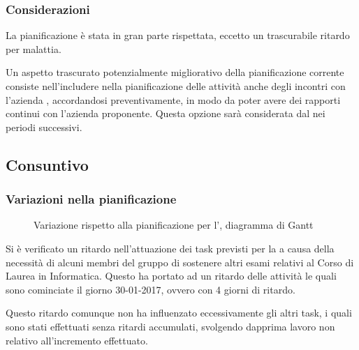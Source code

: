 \subsubsection{Considerazioni}
La pianificazione è stata in gran parte rispettata, eccetto un trascurabile ritardo per malattia. 

Un aspetto trascurato potenzialmente migliorativo della pianificazione corrente consiste nell'includere nella pianificazione delle attività anche degli incontri con l'azienda \ZU, accordandosi preventivamente, in modo da poter avere dei rapporti continui con l'azienda proponente. Questa opzione sarà considerata dal \Rx{} nei periodi successivi.



\pagebreak
\subsection{Consuntivo \ARI}
\introconsuntivo{\ARI}

\subsubsection{Variazioni nella pianificazione}

\begin{figure}[H]
\label{tab:cgen1}

  \caption{Variazione rispetto alla pianificazione per l'\ARI, diagramma di Gantt}
\end{figure}

Si è verificato un ritardo nell'attuazione dei task previsti per la \ARI{} a causa della necessità di alcuni membri del gruppo di sostenere altri esami relativi al Corso di Laurea in Informatica. Questo ha portato ad un ritardo delle attività le quali sono cominciate il giorno 30-01-2017, ovvero con 4 giorni di ritardo.

Questo ritardo comunque non ha influenzato eccessivamente gli altri task, i quali sono stati effettuati senza ritardi accumulati, svolgendo dapprima lavoro non relativo all'incremento effettuato.


